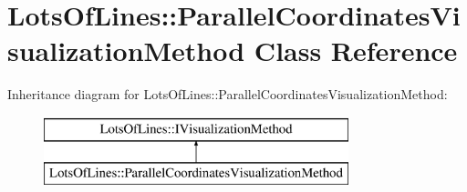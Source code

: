\hypertarget{class_lots_of_lines_1_1_parallel_coordinates_visualization_method}{}\section{Lots\+Of\+Lines\+:\+:Parallel\+Coordinates\+Visualization\+Method Class Reference}
\label{class_lots_of_lines_1_1_parallel_coordinates_visualization_method}
Inheritance diagram for Lots\+Of\+Lines\+:\+:Parallel\+Coordinates\+Visualization\+Method\+:\begin{figure}[H]
\begin{center}
\leavevmode
\includegraphics[height=2.000000cm]{class_lots_of_lines_1_1_parallel_coordinates_visualization_method}
\end{center}
\end{figure}
